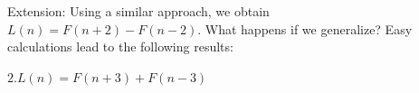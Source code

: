 {%
%
%
%
%
%
%
%
%
%
%
%
%

Extension:
Using a similar approach, we obtain $L(n) = F(n+2)-F(n-2)$. 
What happens if we generalize? Easy calculations lead to the following results:
\medskip

$2.L(n) = F(n+3) + F(n-3) $

%
%
%
%
%
%
%
%
%
%
%
%
%
% 
%
%
%
%
%
%
%
%

}
